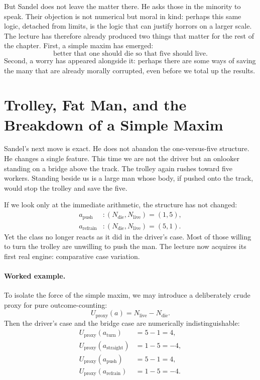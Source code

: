 But Sandel does not leave the matter there. He asks those in the minority to speak. Their objection is not numerical but moral in kind: perhaps this same logic, detached from limits, is the logic that can justify horrors on a larger scale. The lecture has therefore already produced two things that matter for the rest of the chapter. First, a simple maxim has emerged:
\begin{equation}
\text{better that one should die so that five should live.}
\end{equation}
Second, a worry has appeared alongside it: perhaps there are some ways of saving the many that are already morally corrupted, even before we total up the results.

\section{Trolley, Fat Man, and the Breakdown of a Simple Maxim}

Sandel's next move is exact. He does not abandon the one-versus-five structure. He changes a single feature. This time we are not the driver but an onlooker standing on a bridge above the track. The trolley again rushes toward five workers. Standing beside us is a large man whose body, if pushed onto the track, would stop the trolley and save the five.

If we look only at the immediate arithmetic, the structure has not changed:
\begin{align}
a_{\text{push}} &: (N_{\text{die}},N_{\text{live}}) = (1,5), \\
a_{\text{refrain}} &: (N_{\text{die}},N_{\text{live}}) = (5,1).
\end{align}
Yet the class no longer reacts as it did in the driver's case. Most of those willing to turn the trolley are unwilling to push the man. The lecture now acquires its first real engine: comparative case variation.

\paragraph{Worked example.}
To isolate the force of the simple maxim, we may introduce a deliberately crude proxy for pure outcome-counting:
\begin{equation}
U_{\text{proxy}}(a) = N_{\text{live}} - N_{\text{die}}.
\end{equation}
Then the driver's case and the bridge case are numerically indistinguishable:
\begin{align}
U_{\text{proxy}}(a_{\text{turn}}) &= 5-1 = 4, \\
U_{\text{proxy}}(a_{\text{straight}}) &= 1-5 = -4, \\
U_{\text{proxy}}(a_{\text{push}}) &= 5-1 = 4, \\
U_{\text{proxy}}(a_{\text{refrain}}) &= 1-5 = -4.
\end{align}

